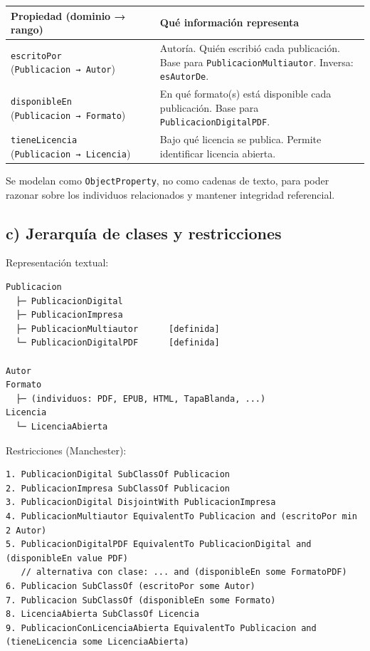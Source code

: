 {\def\LTcaptype{none} %
\begin{longtable}[]{@{}
  >{\raggedright\arraybackslash}p{}
  >{\raggedright\arraybackslash}p{}@{}}
\toprule\noalign{}
\begin{minipage}[b]{\linewidth}\raggedright
Propiedad (dominio → rango)
\end{minipage} & \begin{minipage}[b]{\linewidth}\raggedright
Qué información representa
\end{minipage} \\
\midrule\noalign{}
\endhead
\bottomrule\noalign{}
\endlastfoot
\texttt{escritoPor} (\texttt{Publicacion\ →\ Autor}) & Autoría. Quién
escribió cada publicación. Base para \texttt{PublicacionMultiautor}.
Inversa: \texttt{esAutorDe}. \\
\texttt{disponibleEn} (\texttt{Publicacion\ →\ Formato}) & En qué
formato(s) está disponible cada publicación. Base para
\texttt{PublicacionDigitalPDF}. \\
\texttt{tieneLicencia} (\texttt{Publicacion\ →\ Licencia}) & Bajo qué
licencia se publica. Permite identificar licencia abierta. \\
\end{longtable}
}

Se modelan como \texttt{ObjectProperty}, no como cadenas de texto, para
poder razonar sobre los individuos relacionados y mantener integridad
referencial.

\subsection{c) Jerarquía de clases y
restricciones}\label{c-jerarquuxeda-de-clases-y-restricciones}

Representación textual:

\begin{verbatim}
Publicacion
  ├─ PublicacionDigital
  ├─ PublicacionImpresa
  ├─ PublicacionMultiautor      [definida]
  └─ PublicacionDigitalPDF      [definida]

Autor
Formato
  ├─ (individuos: PDF, EPUB, HTML, TapaBlanda, ...)
Licencia
  └─ LicenciaAbierta
\end{verbatim}

Restricciones (Manchester):

\begin{verbatim}
1. PublicacionDigital SubClassOf Publicacion
2. PublicacionImpresa SubClassOf Publicacion
3. PublicacionDigital DisjointWith PublicacionImpresa
4. PublicacionMultiautor EquivalentTo Publicacion and (escritoPor min 2 Autor)
5. PublicacionDigitalPDF EquivalentTo PublicacionDigital and (disponibleEn value PDF)
   // alternativa con clase: ... and (disponibleEn some FormatoPDF)
6. Publicacion SubClassOf (escritoPor some Autor)
7. Publicacion SubClassOf (disponibleEn some Formato)
8. LicenciaAbierta SubClassOf Licencia
9. PublicacionConLicenciaAbierta EquivalentTo Publicacion and (tieneLicencia some LicenciaAbierta)
\end{verbatim}

